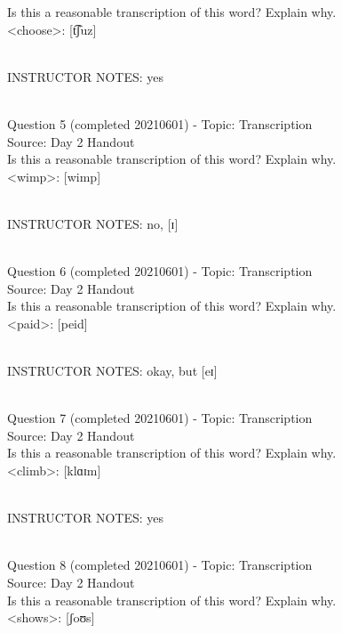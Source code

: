 \documentclass[12pt]{article}
\begin{document}
Is this a reasonable transcription of this word? Explain why.\\

<choose>: {[t͡ʃuz]}


~\\
INSTRUCTOR NOTES: yes


~\\

{\large Question 5} (completed 20210601) - Topic: Transcription\\
Source: Day 2 Handout\\

Is this a reasonable transcription of this word? Explain why.\\

<wimp>: {[wimp]}


~\\
INSTRUCTOR NOTES: no, [ɪ]


~\\

{\large Question 6} (completed 20210601) - Topic: Transcription\\
Source: Day 2 Handout\\

Is this a reasonable transcription of this word? Explain why.\\

<paid>: {[peid]}


~\\
INSTRUCTOR NOTES: okay, but [eɪ]


~\\

{\large Question 7} (completed 20210601) - Topic: Transcription\\
Source: Day 2 Handout\\

Is this a reasonable transcription of this word? Explain why.\\

<climb>: {[klɑɪm]}


~\\
INSTRUCTOR NOTES: yes


~\\

{\large Question 8} (completed 20210601) - Topic: Transcription\\
Source: Day 2 Handout\\

Is this a reasonable transcription of this word? Explain why.\\

<shows>: {[ʃoʊs]}
\end{document}

